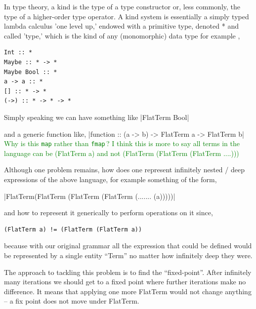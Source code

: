 \documentclass[thesis-solanki.tex]{subfiles}
\begin{document}
In type theory, a kind is the type of a type constructor or, less commonly, the type of a higher-order type operator. A kind system is
essentially a simply typed lambda calculus 'one level up,' endowed with a primitive type, denoted * and called 'type,' which is the kind of
any (monomorphic) data type for example \cite{website:kindhaskellwiki},

\begin{verbatim}
Int :: *
Maybe :: * -> *
Maybe Bool :: *
a -> a :: *
[] :: * -> *
(->) :: * -> * -> *
\end{verbatim}

Simply speaking we can have something like
|FlatTerm Bool|

and a generic function like,
|function :: (a -> b) -> FlatTerm a -> FlatTerm b|
\textcolor{green}{%
  Why is this {\color{blue}\Verb|map|} rather than {\color{blue}\Verb|fmap|}\,?
  I think this is more to say all terms in the language can be (FlatTerm a) and not (FlatTerm (FlatTerm (FlatTerm ....)))
}

Although one problem remains, how does one represent infinitely nested / deep expressions of the above language, for example something of
the form,

|FlatTerm(FlatTerm (FlatTerm (FlatTerm (....... (a)))))|

and how to represent it generically to perform operations on it since,
\begin{verbatim}
(FlatTerm a) != (FlatTerm (FlatTerm a))
\end{verbatim}
%
because with our original grammar all the expression that could be defined would be represented by a single entity ``Term'' no matter how
infinitely deep they were.

The approach to tackling this problem is to find the ``fixed-point''.
After infinitely many iterations we should get to a fixed point where further iterations make no
difference.
It means that applying one more FlatTerm would not change anything – a fix point does not move under FlatTerm.
\end{document}
